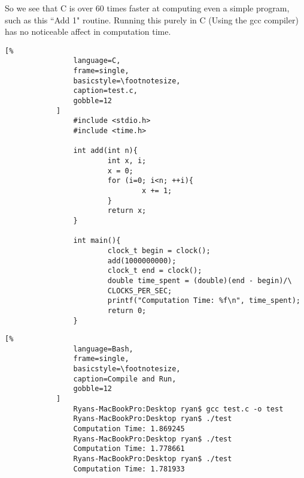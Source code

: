\documentclass[crop=false,class=book]{standalone}
\begin{document}
            So we see that C is over 60 times faster at computing even a simple program, such as this ``Add 1" routine.
            Running this purely in C (Using the gcc compiler) has no
            noticeable affect in computation time.
            \begin{lstlisting}[%
                language=C,
                frame=single,
                basicstyle=\footnotesize,
                caption=test.c,
                gobble=12
            ]
                #include <stdio.h>
                #include <time.h>
                
                int add(int n){
                        int x, i;
                        x = 0;
                        for (i=0; i<n; ++i){
                                x += 1;
                        }
                        return x;
                }
                
                int main(){
                        clock_t begin = clock();
                        add(1000000000);
                        clock_t end = clock();
                        double time_spent = (double)(end - begin)/\
                        CLOCKS_PER_SEC;
                        printf("Computation Time: %f\n", time_spent);
                        return 0;
                }
            \end{lstlisting}
            \newpage
            \begin{lstlisting}[%
                language=Bash,
                frame=single,
                basicstyle=\footnotesize,
                caption=Compile and Run,
                gobble=12
            ]
                Ryans-MacBookPro:Desktop ryan$ gcc test.c -o test
                Ryans-MacBookPro:Desktop ryan$ ./test
                Computation Time: 1.869245
                Ryans-MacBookPro:Desktop ryan$ ./test
                Computation Time: 1.778661
                Ryans-MacBookPro:Desktop ryan$ ./test
                Computation Time: 1.781933
            \end{lstlisting}
\end{document}
